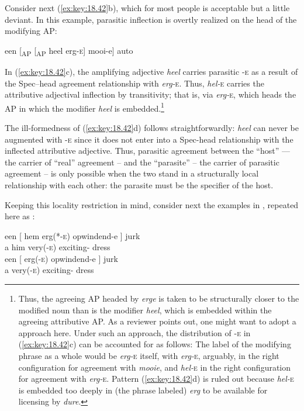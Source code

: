 \documentclass[output=paper]{langsci/langscibook}
\begin{document}
Consider next (\ref{ex:key:18.42}b), which for most people is acceptable but a
little deviant. In this example, parasitic inflection is overtly realized on
the head of the modifying AP:

\ea%
    \label{ex:key:18.45}
    een [\textsubscript{AP} [\textsubscript{AP} heel erg-\textsc{e}] mooi\textsubscript{}-e] auto
\z

In (\ref{ex:key:18.42}c), the amplifying adjective \emph{heel} carries parasitic
\textsc{-e} as a result of the Spec--head agreement relationship with
\emph{erg-}\textsc{e}. Thus, \emph{hel-}\textsc{e} carries the attributive
adjectival inflection by transitivity; that is, via \emph{erg-}\textsc{e},
which heads the AP in which the modifier \emph{heel} is
embedded.\footnote{Thus, the agreeing AP headed by \emph{erge} is taken to be
structurally closer to the modified noun than is the modifier \emph{heel},
which is embedded within the agreeing attributive AP. As a reviewer points out,
one might want to adopt a  approach here. Under such an
approach, the distribution of \textsc{-e} in (\ref{ex:key:18.42}c) can be accounted
for as follows: The label of the modifying phrase as a whole would be
\emph{erg-}\textsc{e} itself, with \emph{erg-}\textsc{e}, arguably, in the
right configuration for agreement with \emph{mooie}, and \emph{hel-}\textsc{e}
in the right configuration for agreement with \emph{erg-}\textsc{e}. Pattern
(\ref{ex:key:18.42}d) is ruled out because \emph{hel-}\textsc{e} is embedded too
deeply in (the phrase labeled) \emph{erg} to be available for licensing by
\emph{dure}.}

The ill-formedness of (\ref{ex:key:18.42}d) follows straightforwardly: \emph{heel}
can never be augmented with \textsc{-e} since it does not enter into a
Spec-head relationship with the inflected attributive adjective. Thus,
parasitic agreement between the \enquote{host} — the carrier of \enquote{real}
agreement – and the \enquote{parasite} – the carrier of parasitic agreement –
is only possible when the two stand in a structurally local relationship with
each other: the parasite must be the specifier of the host.

Keeping this locality restriction in mind, consider next the examples in
, repeated here as :

\ea%
    \label{ex:key:18.46}
	\ea
	\gll een [ hem  erg(*-\textsc{e})  opwindend-e ]    jurk\\
    a   {}     him  very(-\textsc{e})    exciting-\Agr{} {} dress\\
	\ex
	\gll een [ erg(-\textsc{e})    opwindend-e ]    jurk \\
    a   {}   very(-\textsc{e})    exciting-\Agr{} {} dress\\
	\z
\z
\end{document}
